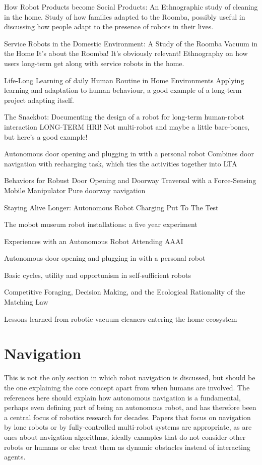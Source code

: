 \documentclass{sfuthesis}
\begin{document}
How Robot Products become Social Products: An Ethnographic study of cleaning in the home.	Study of how families adapted to the Roomba, possibly useful in discussing how people adapt to the presence of robots in their lives.	

Service Robots in the Domestic Environment: A Study of the Roomba Vacuum in the Home	It's about the Roomba! It's obviously relevant! Ethnography on how users long-term get along with service robots in the home.	

Life-Long Learning of daily Human Routine in Home Environments	Applying learning and adaptation to human behaviour, a good example of a long-term project adapting itself.

The Snackbot: Documenting the design of a robot for long-term human-robot interaction	LONG-TERM HRI! Not multi-robot and maybe a little bare-bones, but here's a good example!

Autonomous door opening and plugging in with a personal robot	Combines door navigation with recharging task, which ties the activities together into LTA

Behaviors for Robust Door Opening and Doorway Traversal with a Force-Sensing Mobile Manipulator		Pure doorway navigation

Staying Alive Longer: Autonomous Robot Charging Put To The Test

The mobot museum robot installations: a five year experiment

Experiences with an Autonomous Robot Attending AAAI

Autonomous door opening and plugging in with a personal robot

Basic cycles, utility and opportunism in self-sufficient robots

Competitive Foraging, Decision Making, and the Ecological Rationality of the Matching Law

Lessons learned from robotic vacuum cleaners entering the home ecosystem

\section{Navigation}

This is not the only section in which robot navigation is discussed, but should be the one explaining the core concept apart from when humans are involved. The references here should explain how autonomous navigation is a fundamental, perhaps even defining part of being an autonomous robot, and has therefore been a central focus of robotics research for decades. Papers that focus on navigation by lone robots or by fully-controlled multi-robot systems are appropriate, as are ones about navigation algorithms, ideally examples that do not consider other robots or humans or else treat them as dynamic obstacles instead of interacting agents.
\end{document}
